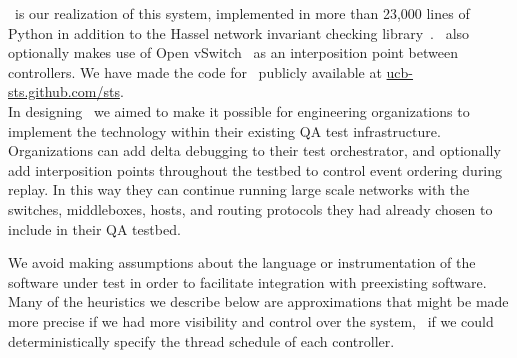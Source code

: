 
\projectname~is our realization of this system, implemented in more than 23,000 lines of Python in
addition to the Hassel network invariant checking library~\cite{hsa}.
\projectname~also optionally makes use of Open vSwitch~\cite{pfaff2009extending} as an interposition point
between controllers. We have
made the code for \projectname~publicly available at
\href{http://ucb-sts.github.com/sts}{ucb-sts.github.com/sts}.\\[0.5ex]
%
 In designing \projectname~we aimed to make
it possible for engineering organizations to
implement the technology within their existing QA test infrastructure.
Organizations can add delta debugging to their test
orchestrator, and optionally add interposition points throughout the
testbed to control event ordering during replay.
In this way they can continue running large scale networks with
the switches, middleboxes, hosts, and routing protocols they had already
chosen to include in their QA testbed.

We avoid making assumptions about the language or instrumentation of the
software under test in order to facilitate integration with preexisting software. Many of the heuristics we describe below are
approximations that might be made more precise if we had more visibility and
control over the system, \eg~if we could deterministically specify the thread schedule of each
controller.


